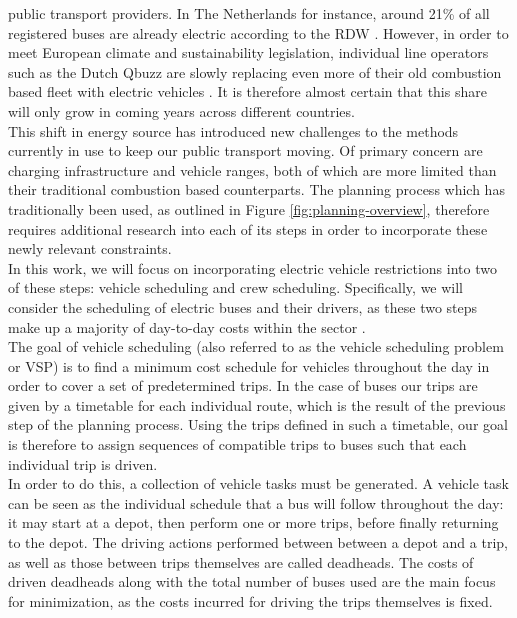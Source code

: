 \documentclass[]{book}
\begin{document}
public transport providers. In The Netherlands for instance, around 21\% of all
registered buses are already electric according to the RDW \cite{RDW}. However,
in order to meet European climate and sustainability legislation, individual
line operators such as the Dutch Qbuzz are slowly replacing even more of their old
combustion based fleet with electric vehicles \cite{europaRegulation20181999, qbuzzQbuzz}. It is therefore almost certain that this share will only grow in
coming years across different countries. \\
This shift in energy source has introduced new challenges to the methods currently in use to keep our public transport moving. Of primary concern are charging infrastructure and vehicle ranges, both of which are more limited than their traditional combustion based counterparts. The planning process which has traditionally been used, as outlined in Figure \ref{fig:planning-overview}, therefore requires additional research into each of its steps in order to incorporate these newly relevant constraints.\\
\noindent In this work, we will focus on incorporating electric vehicle restrictions into two of these steps: vehicle scheduling and crew scheduling. Specifically, we will consider the scheduling of electric buses and their drivers, as these two steps make up a majority of day-to-day costs within the sector \cite{Perumal2019Crew}. \\
The goal of vehicle scheduling (also referred to as the vehicle scheduling problem or VSP) is to find a minimum cost schedule for vehicles throughout the day in order to cover a set of predetermined trips. In the case of buses our trips are given by a timetable for each individual route, which is the result of the previous step of the planning process. Using the trips defined in such a timetable, our goal is therefore to assign sequences of compatible trips to buses such that each individual trip is driven. \\
In order to do this, a collection of vehicle tasks must be generated. A vehicle task can be seen as the individual schedule that a bus will follow throughout the day: it may start at a depot, then perform one or more trips, before finally returning to the depot. The driving actions performed between between a depot and a trip, as well as those between trips themselves are called deadheads. The costs of driven deadheads along with the total number of buses used are the main focus for minimization, as the costs incurred for driving the trips themselves is fixed. \\
\end{document}

